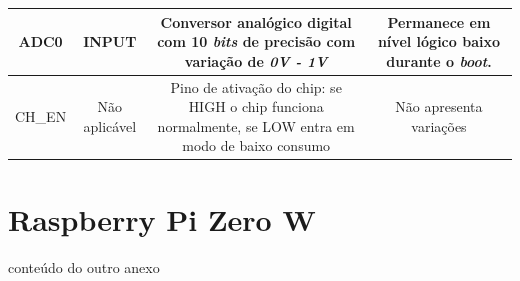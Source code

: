 \begin{anexosenv}
\begin{center}
\begin{longtable}{c|c|c|c}
		ADC0 & INPUT & \multicolumn{1}{m{5cm}|}{Conversor analógico digital com 10 \textit{bits} de precisão com variação de \textit{0V - 1V}} & \multicolumn{1}{m{4cm}}{Permanece em nível lógico baixo durante o \textit{boot}.}\\ \hline
		
		 CH\_EN & Não aplicável & \multicolumn{1}{m{5cm}|}{Pino de ativação do chip: se HIGH o chip funciona normalmente, se LOW entra em modo de baixo consumo} & \multicolumn{1}{m{4cm}}{Não apresenta variações}\\ \hline
	
	\end{longtable}
	
\end{center}


\chapter{Raspberry Pi Zero W}
\label{chap:anexoB}

conteúdo do outro anexo

\end{anexosenv}
